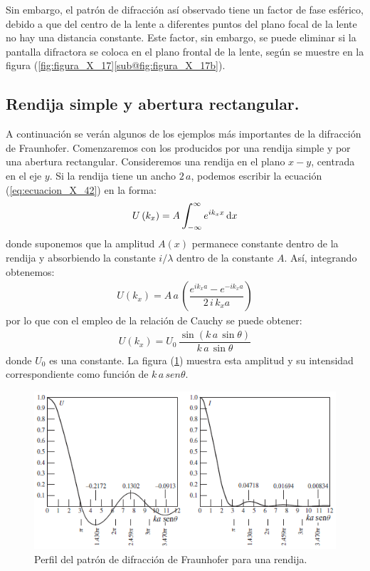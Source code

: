 \documentclass[14pt]{extarticle}
\def\scaleint#1{\vcenter{\hbox{\scaleto[3ex]{\displaystyle\int}{#1}}}}
\def\bs{\mkern-12mu}
\begin{document}
Sin embargo, el patrón de difracción así observado tiene un factor de fase esférico, debido a que del centro de la lente a diferentes puntos del plano focal de la lente no hay una distancia constante. Este factor, sin embargo, se puede eliminar si la pantalla difractora se coloca en el plano frontal de la lente, según se muestre en la figura (\ref{fig:figura_X_17}\ref{sub@fig:figura_X_17b}). 

\subsection{Rendija simple y abertura rectangular.}

A continuación se verán algunos de los ejemplos más importantes de la difracción de Fraunhofer. Comenzaremos con los producidos por una rendija simple y por una abertura rectangular. Consideremos una rendija en el plano $x-y$, centrada en el eje $y$. Si la rendija tiene un ancho $2 \, a$, podemos escribir la ecuación (\ref{eq:ecuacion_X_42}) en la forma:
\begin{align}
U \left( k_{x} \right) = A \, \scaleint{6ex}_{\bs -\infty}^{\infty} \, e^{i k_{x} x} \dd{x}
\label{eq:ecuacion_X_45}
\end{align}
donde suponemos que la amplitud $A (x)$ permanece constante dentro de la rendija y absorbiendo la constante $i/\lambda$ dentro de la constante $A$. Así, integrando obtenemos:
\begin{align}
U \left( k_{x} \right) = A \, a \, \left( \dfrac{e^{i k_{x} a} - e^{-i k_{x} a}}{2 \, i \, k_{x} a} \right)
\label{eq:ecuacion_X_46}
\end{align}
por lo que con el empleo de la relación de Cauchy se puede obtener:
\begin{align}
U \left( k_{x} \right) = U_{0} \, \dfrac{\sin (k \, a \, \sin \theta)}{k \, a \, \sin \theta}
\label{eq:ecuacion_X_47}
\end{align}
donde $U_{0}$ es una constante. La figura (\ref{fig:figura_X_18}) muestra esta amplitud y su intensidad correspondiente como función de $k \, a \, sen \theta$.
\begin{figure}[H]
    \centering
    \includegraphics[scale=0.8]{Imagenes/Difraccion_18.png}
    \caption{Perfil del patrón de difracción de Fraunhofer para una rendija.}
    \label{fig:figura_X_18}
\end{figure}
\end{document}
